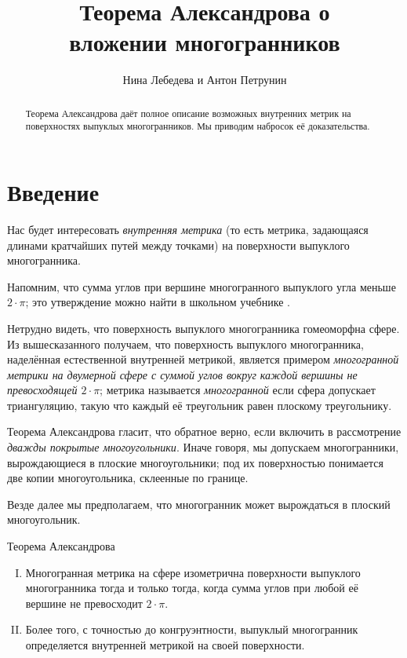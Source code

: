 \documentclass[oneside,a4paper]{article}
\begin{document}

\title{Теорема Александрова о\\ вложении многогранников}
\author{Нина Лебедева и Антон Петрунин}
\date{}
\maketitle

\begin{abstract}
Теорема Александрова даёт полное описание возможных внутренних метрик на поверхностях выпуклых многогранников.
Мы приводим набросок её доказательства.
\end{abstract}

\section{Введение}

Нас будет интересовать \emph{внутренняя метрика} (то есть метрика, задающаяся длинами кратчайших путей между точками) на поверхности выпуклого многогранника.

Напомним, что сумма углов при вершине многогранного выпуклого угла меньше $2\cdot \pi$; 
это утверждение можно найти в школьном учебнике \cite[§~325]{kiselyov}.

Нетрудно видеть, что поверхность выпуклого многогранника гомеоморфна сфере.
Из вышесказанного получаем, что поверхность выпуклого многогранника, наделённая естественной внутренней метрикой,
является примером \emph{многогранной метрики на двумерной сфере с суммой углов вокруг каждой вершины не превосходящей $2\cdot\pi$}; 
метрика называется \emph{многогранной} если сфера допускает триангуляцию, 
такую что каждый её треугольник равен плоскому треугольнику.

Теорема Александрова гласит, что обратное верно, если включить в рассмотрение \emph{дважды покрытые многоугольники}.
Иначе говоря, мы допускаем многогранники, вырождающиеся в плоские многоугольники;
под их поверхностью понимается две копии многоугольника, склеенные по границе.

Везде далее мы предполагаем, что многогранник может вырождаться в плоский многоугольник.

\begin{thm}{Теорема Александрова}
\begin{enumerate}[I.]
\item\label{thm:exist} Многогранная метрика на сфере изометрична поверхности выпуклого многогранника тогда и только тогда, когда сумма углов при любой её вершине не превосходит $2\cdot\pi$.

\item\label{thm:unique}
Более того, с точностью до конгруэнтности, выпуклый многогранник определяется внутренней метрикой на своей поверхности.
\end{enumerate}

\end{thm}
\end{document}
